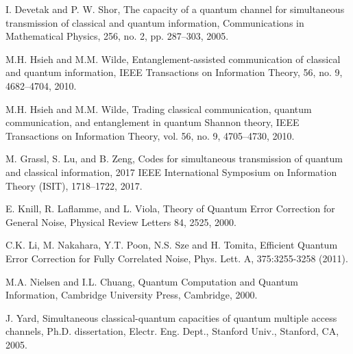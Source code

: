 \documentclass[11pt]{article}
\begin{document}
\begin{thebibliography}{WWW}


 I. Devetak and P. W. Shor,  The capacity of a quantum channel
for simultaneous transmission of classical and quantum information, 
Communications in Mathematical Physics,  256, no. 2, pp. 287–303,
2005.



  M.H. Hsieh  and M.M. Wilde,  Entanglement-assisted communication of classical and quantum information, IEEE Transactions on Information Theory, 56, no. 9, 4682--4704, 2010.

 M.H. Hsieh  and M.M. Wilde,  Trading classical communication, quantum communication, and entanglement in quantum Shannon theory, IEEE Transactions on Information
Theory, vol. 56, no. 9,   4705--4730,   2010.


 M. Grassl, S. Lu, and B. Zeng, Codes for simultaneous transmission of quantum and 
classical information, 
2017 IEEE International Symposium on Information Theory (ISIT),  1718--1722, 2017.


E. Knill, R. Laflamme, and L. Viola, 
Theory of Quantum Error Correction for General Noise,
Physical Review
Letters 84, 2525, 2000.

 C.K. Li, M. Nakahara, Y.T. Poon, N.S. Sze and H. Tomita,
Efficient Quantum Error Correction for Fully Correlated Noise, 
Phys. Lett. A, 375:3255-3258 (2011).

 M.A. Nielsen and I.L. Chuang,
Quantum Computation and Quantum Information, 
Cambridge University Press, Cambridge, 2000.

 J. Yard,  Simultaneous classical-quantum capacities of quantum multiple
access channels,  Ph.D. dissertation, Electr. Eng. Dept., Stanford
Univ., Stanford, CA, 2005.
 

\end{thebibliography}
\end{document}
